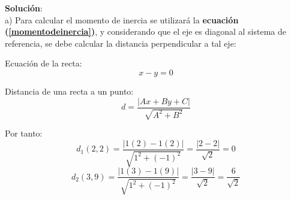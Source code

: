 \documentclass[letter,11pt]{article}
\begin{document}
\vspace{0.50cm}
\begin{minipage}[b]{.9\linewidth}
\textbf{Solución}:\\
a) Para calcular el momento de inercia se utilizará la \textbf{ecuación
(\ref{momentodeinercia})}, y considerando que el eje es diagonal al sistema de
referencia, se debe calcular la distancia perpendicular a tal eje:

Ecuación de la recta:
\begin{equation*}
    x - y = 0
\end{equation*}

Distancia de una recta a un punto:
\begin{equation*}
    d = \frac{| A x + B y + C |}{\sqrt{A^2 + B^2}}
\end{equation*}

Por tanto:
\begin{equation*}
    d_1(2,2) = \frac{| 1 (2) - 1 (2) |}{\sqrt{1^2 + (-1)^2}} = \frac{|2 - 2|}{\sqrt{2}} = 0
\end{equation*}
\begin{equation*}
    d_2(3,9) = \frac{| 1 (3) - 1 (9) |}{\sqrt{1^2 + (-1)^2}} = \frac{|3 - 9|}{\sqrt{2}} = \frac{6}{\sqrt{2}}
\end{equation*}
\end{minipage}
\end{document}
